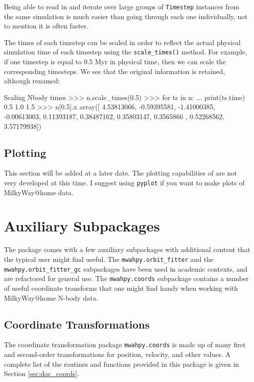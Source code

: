\documentclass{article}
\begin{document}
Being able to read in and iterate over large groups of \verb!Timestep! instances from the same simulation is much easier than going through each one individually, not to mention it is often faster. 

The times of each timestep can be scaled in order to reflect the actual physical simulation time of each timestep using the \verb!scale_times()! method. For example, if one timestep is equal to 0.5 Myr in physical time, then we can scale the corresponding timesteps. We see that the original information is retained, although renamed: \\

\begin{codelisting}{Scaling Nbody times}
>>> n.scale_times(0.5)
>>> for ts in n:
...     print(ts.time)
0.5
1.0
1.5
>>> n[0.5].x
array([ 4.53813066, -0.59395581, -1.41000385, -0.00613003,  0.11393187,
        0.38487162,  0.35803147,  0.3565866 ,  0.52268562,  3.57179938])
\end{codelisting}

\subsection{Plotting}

This section will be added at a later date. The plotting capabilities of \mwahpy are not very developed at this time. I suggest using \verb!pyplot! if you want to make plots of MilkyWay@home data.

\newpage

\section{Auxiliary Subpackages}

The \mwahpy package comes with a few auxiliary subpackages with additional content that the typical user might find useful. The \verb!mwahpy.orbit_fitter! and the \verb!mwahpy.orbit_fitter_gc! subpackages have been used in academic contexts, and are refactored for general use. The \verb!mwahpy.coords! subpackage contains a number of useful coordinate transforms that one might find handy when working with MilkyWay@home N-body data.

\subsection{Coordinate Transformations}

The coordinate transformation package \verb!mwahpy.coords! is made up of many first and second-order transformations for position, velocity, and other values. A complete list of the routines and functions provided in this package is given in Section \ref{sec:doc_coords}. 
\end{document}
